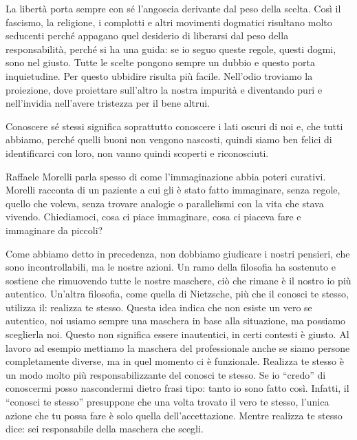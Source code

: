 \documentclass[12pt]{book} %
\begin{document}
\bigskip

La libertà porta sempre con sé l'angoscia derivante dal peso della scelta. Così il fascismo, la religione, i complotti e
altri movimenti dogmatici risultano molto seducenti perché appagano quel desiderio di liberarsi dal peso della
responsabilità, perché si ha una guida: se io seguo queste regole, questi dogmi, sono nel giusto. Tutte le scelte
pongono sempre un dubbio e questo porta inquietudine. Per questo ubbidire risulta più facile. Nell'odio troviamo la
proiezione, dove proiettare sull'altro la nostra impurità e diventando puri e nell'invidia
nell'avere tristezza per il bene altrui.


\bigskip

Conoscere sé stessi significa soprattutto conoscere i lati oscuri di noi e, che tutti abbiamo, perché quelli buoni non
vengono nascosti, quindi siamo ben felici di identificarci con loro, non vanno quindi scoperti e riconosciuti.


\bigskip

Raffaele Morelli parla spesso di come l'immaginazione abbia poteri curativi. Morelli racconta di un
paziente a cui gli è stato fatto immaginare, senza regole, quello che voleva, senza trovare analogie o parallelismi con
la vita che stava vivendo. Chiediamoci, cosa ci piace immaginare, cosa ci piaceva fare e immaginare da piccoli?


\bigskip

Come abbiamo detto in precedenza, non dobbiamo giudicare i nostri pensieri, che sono incontrollabili, ma le nostre
azioni. Un ramo della filosofia ha sostenuto e sostiene che rimuovendo tutte le nostre maschere, ciò che rimane è il
nostro io più autentico. Un'altra filosofia, come quella di Nietzsche, più che il conosci te
stesso, utilizza il: realizza te stesso. Questa idea indica che non esiste un vero se autentico, noi usiamo sempre una
maschera in base alla situazione, ma possiamo sceglierla noi. Questo non significa essere inautentici, in certi
contesti è giusto. Al lavoro ad esempio mettiamo la maschera del professionale anche se siamo persone completamente
diverse, ma in quel momento ci è funzionale. Realizza te stesso è un modo molto più responsabilizzante del conosci te
stesso. Se io “credo” di conoscermi posso nascondermi dietro frasi tipo: tanto io sono fatto così. Infatti, il “conosci
te stesso” presuppone che una volta trovato il vero te stesso, l'unica azione che tu possa fare è
solo quella dell'accettazione. Mentre realizza te stesso dice: sei responsabile della maschera che
scegli.
\end{document}
